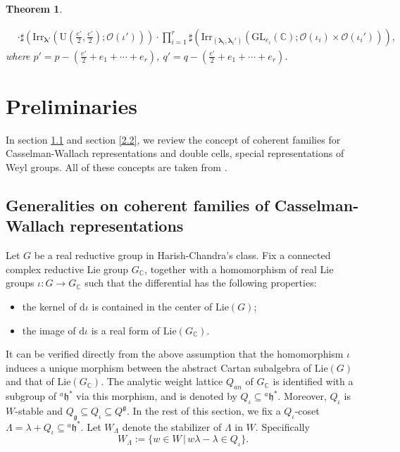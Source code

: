 \documentclass[12pt, a4paper]{amsart}
\numberwithin{equation}{section}
\newtheorem{thm}{Theorem}[section]
\newcommand{\blam}{{\boldsymbol{\lambda}}}
\newcommand{\BC}{{\mathbb {C}}}
\newcommand{\CO}{{\mathcal {O}}}
\newcommand{\fg}{\mathfrak{g}}
\newcommand{\fh}{\mathfrak{h}}
\newcommand{\GL}{{\mathrm{GL}}}
\newcommand{\U}{{\mathrm{U}}}
\newcommand{\Irr}{{\mathrm{Irr}}}
\newcommand{\Lie}{{\mathrm{Lie}}}
\newcommand{\set}[2]{\{#1\,|\,#2\}}
\begin{document}
\begin{thm}
\begin{enumerate}
\begin{align*}
            & \cdot \sharp(\Irr_{\blam'}(\U(\frac{e'}{2},\frac{e'}{2});\CO(\iota')))\cdot \prod_{i=1}^{r} \sharp(\Irr_{(\blam_i,\blam_i')}(\GL_{e_i}(\BC);\CO(\iota_i)\times \CO(\iota_i'))),
        \end{align*}
        where $p' = p - (\frac{e'}{2} + e_1 + \cdots + e_r) $, $q' = q - (\frac{e'}{2} + e_1 + \cdots + e_r)$.
    \end{enumerate}
\end{thm}


\section{Preliminaries}

In section \ref{2.1} and section \ref{2.2}, we review the concept of coherent families for Casselman-Wallach representations and double cells, special representations of Weyl groups. All of these concepts are taken from \cite[Chapter 4]{BMSZ}.

\subsection{Generalities on coherent families of Casselman-Wallach representations}\label{2.1}
Let $G$ be a real reductive group in Harish-Chandra's class. Fix a connected complex reductive Lie group $G_\BC$, together with a homomorphism of real Lie groups $\iota: G \to G_\BC$ such that the differential has the following properties:
\begin{itemize}
   \item the kernel of $\mathrm{d}\iota$ is contained in the center of $\mathrm{Lie}(G)$;
   \item the image of $\mathrm{d}\iota$ is a real form of $\mathrm{Lie}(G_\BC)$.
\end{itemize}
It can be verified directly from the above assumption that the homomorphism $\iota$ induces a unique morphism between the abstract Cartan subalgebra of $\Lie(G)$ and that of $\Lie(G_{\BC})$. The analytic weight lattice $Q_{an}$ of $G_\BC$ is identified with a subgroup of ${^{a}\fh^*}$ via this morphism, and is denoted by $Q_{\iota} \subseteq  {^{a}\fh^*}$. Moreover, $Q_{\iota}$ is $W$-stable and $Q_{\fg} \subseteq Q_{\iota} \subseteq Q^{\fg}$. In the rest of this section, we fix a $Q_{\iota}$-coset $\Lambda = \lambda + Q_{\iota} \subseteq {^a\fh^*}$. Let $W_{\Lambda}$ denote the stabilizer of $\Lambda$ in $W$. Specifically 
$$W_{\Lambda} := \set{w \in W}{w\lambda - \lambda \in Q_{\iota}}.$$
\end{document}
